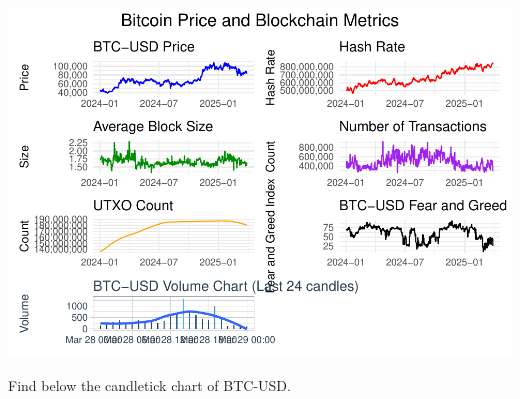 \documentclass[
]{article}
\begin{document}
\includegraphics{REPORT_files/figure-latex/visual_analysis-1.pdf}

Find below the candletick chart of BTC-USD.
\end{document}
